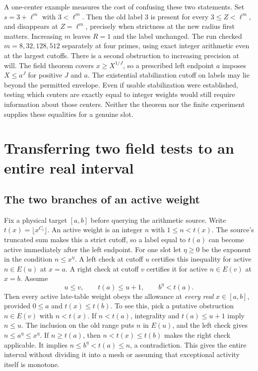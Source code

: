 \documentclass[12pt,letterpaper]{article}
\begin{document}
A one-center example measures the cost of confusing these two statements. Set $s=3+\ell^m$ with $3<\ell^m$. Then the old label $3$ is present for every $3\le Z<\ell^m$, and disappears at $Z=\ell^m$, precisely when strictness at the new radius first matters. Increasing $m$ leaves $R=1$ and the label unchanged. The run checked $m=8,32,128,512$ separately at four primes, using exact integer arithmetic even at the largest cutoffs. There is a second obstruction to increasing precision at will. The field theorem covers $x\ge X^{1/J}$, so a prescribed left endpoint $a$ imposes $X\le a^J$ for positive $J$ and $a$. The existential stabilization cutoff on labels may lie beyond the permitted envelope. Even if usable stabilization were established, testing which centers are exactly equal to integer weights would still require information about those centers. Neither the theorem nor the finite experiment supplies these equalities for a genuine slot.

\section{Transferring two field tests to an entire real interval}

\subsection{The two branches of an active weight}

Fix a physical target $[a,b]$ before querying the arithmetic source. Write $t(x)=\lfloor x^{C_t}\rfloor$. An active weight is an integer $n$ with $1\le n<t(x)$. The source's truncated sum makes this a strict cutoff, so a label equal to $t(a)$ can become active immediately after the left endpoint. For one slot let $\eta\ge0$ be the exponent in the condition $n\le x^\eta$. A left check at cutoff $u$ certifies this inequality for active $n\in E(u)$ at $x=a$. A right check at cutoff $v$ certifies it for active $n\in E(v)$ at $x=b$. Assume
\[
              u\le v,\qquad t(a)\le u+1,\qquad b^\eta<t(a).
\]
Then every active late-table weight obeys the allowance at \emph{every real} $x\in[a,b]$, provided $0\le a$ and $t(x)\le t(b)$. To see this, pick a putative obstruction $n\in E(v)$ with $n<t(x)$. If $n<t(a)$, integrality and $t(a)\le u+1$ imply $n\le u$. The inclusion on the old range puts $n$ in $E(u)$, and the left check gives $n\le a^\eta\le x^\eta$. If $n\ge t(a)$, then $n<t(x)\le t(b)$ makes the right check applicable. It implies $n\le b^\eta<t(a)\le n$, a contradiction. This gives the entire interval without dividing it into a mesh or assuming that exceptional activity itself is monotone.
\end{document}

